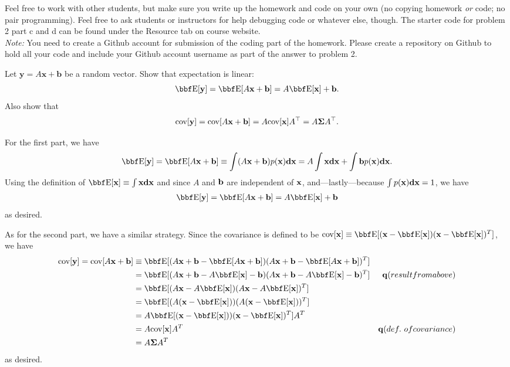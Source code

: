 \documentclass[12pt,letterpaper]{hmcpset}
\begin{document}
Feel free to work with other students, but make sure you write up the homework
and code on your own (no copying homework \textit{or} code; no pair programming).
Feel free to ask students or instructors for help debugging code or whatever else,
though.
The starter code for problem 2 part c and d can be found under the Resource tab on course website.\\

\textit{Note:} You need to create a Github account for submission of the coding part of the homework. Please create a repository on Github to hold all your code and include your Github account username as part of the answer to problem 2.

\begin{problem}
Let $\mathbf{y} = A\mathbf{x} + \mathbf{b}$ be a random vector.
Show that expectation is linear:
\[
    \EE[\yy] = \EE[A\xx + \bb] = A\EE[\xx] + \bb.
\]
Also show that
\[
    {\hbox{cov}}[{\bf y}] = {\hbox{cov}}[A{\bf x} + {\bf b}] = A {\hbox{cov}}[{\bf x}] A^\top = A\hbox{\boldmath$\Sigma$} A^\top.
\]
\end{problem}
\begin{solution}
    For the first part, we have 
    \begin{align*}
         \EE[\yy] = \EE[A\xx + \bb] \equiv \int (A \xx  + \bb) p(\xx) \dd{\xx} = A \int \xx \dd{\xx} + \int \bb p(\xx) \dd{\xx}.
    \end{align*}
    Using the definition of $\EE[\xx] \equiv \int \xx \dd{\xx}$ and since $A$ and ${\bf b}$ are independent of ${\bf x}$, and---lastly---because $\int p({\bf x}) {\bf d}{{\bf x}} = 1$, we have
    \begin{align*}
         \EE[\yy] = \EE[A\xx + \bb] = A\EE[\xx] + \bb
    \end{align*}
    as desired.

    As for the second part, we have a similar strategy. Since the covariance is defined to be  $\cov[\xx] \equiv \EE[(\xx - \EE[\xx])(\xx - \EE[\xx])^T]$, we have
    \begin{align*}
         \cov[\yy] = \cov[A\xx + \bb] &\equiv  \EE[(A\xx + \bb - \EE[A\xx + \bb])(A\xx + \bb - \EE[A\xx + \bb])^T] \\
         &= \EE[(A\xx + \bb - A\EE[\xx]  -\bb)(A\xx + \bb - A\EE[\xx]  -\bb)^T] &\qq{(result from above)} \\
         &=\EE[(A\xx - A\EE[\xx])(A\xx  - A\EE[\xx])^T] \\
         &= \EE[(A(\xx - \EE[\xx]))(A(\xx - \EE[\xx]))^T] \\
         &= A\EE[(\xx - \EE[\xx]))(\xx - \EE[\xx])^T] A^T \\
         &= A \cov[\xx] A^T &\qq{(def.\ of covariance)} \\
         &= A \Sigmab A^T
    \end{align*}
    as desired.
\end{solution}
\newpage
\end{document}

